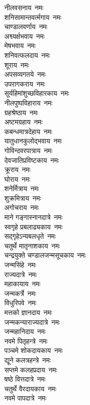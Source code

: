 \begin{flushleft}
\begin{multicols}{2}
नीलवसनाय~नमः\\
शनिसामान्तवर्त्मगाय~नमः\\
चाण्डालवर्णाय~नमः\\
अश्व्यर्क्षभवाय~नमः\\
मेषभवाय~नमः\\
शनिवत्फलदाय~नमः\\
शूराय~नमः\\
अपसव्यगतये~नमः\\
उपरागकराय~नमः\\
सूर्यहिमांशुच्छविहारकाय~नमः\hfill{}\\
नीलपुष्पविहाराय~नमः\\
ग्रहश्रेष्ठाय~नमः\\
अष्टमग्रहाय~नमः\\
कबन्धमात्रदेहाय~नमः\\
यातुधानकुलोद्भवाय~नमः\\
गोविन्दवरपात्राय~नमः\\
देवजातिप्रविष्टकाय~नमः\\
क्रूराय~नमः\\
घोराय~नमः\\
शनेर्मित्राय~नमः\hfill{}\\
शुक्रमित्राय~नमः\\
अगोचराय~नमः\\
माने गङ्गास्नानदात्रे~नमः\\
स्वगृहे प्रबलाढ्यकाय~नमः\\
सद्गृहेऽन्यबलधृते~नमः\\
चतुर्थे मातृनाशकाय~नमः\\
चन्द्रयुक्ते चण्डालजन्मसूचकाय~नमः\\
जन्मसिंहे~नमः\\
राज्यदात्रे~नमः\\
महाकायाय~नमः\hfill{}\\
जन्मकर्त्रे~नमः\\
विधुरिपवे~नमः\\
मत्तको ज्ञानदाय~नमः\\
जन्मकन्याराज्यदात्रे~नमः\\
जन्महानिदाय~नमः\\
नवमे पितृहन्त्रे~नमः\\
पञ्चमे शोकदायकाय~नमः\\
द्यूने कलत्रहन्त्रे~नमः\\
सप्तमे कलहप्रदाय~नमः\\
षष्ठे वित्तदात्रे~नमः\hfill{}\\
चतुर्थे वैरदायकाय~नमः\\
नवमे पापदात्रे~नमः\\

\end{multicols}
\end{flushleft}
